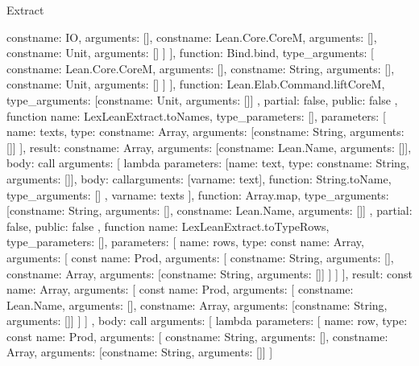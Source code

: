 \begin{lexlean}{Extract}
\begin{toolingmodule}
{{{{{{                    const{name: IO, arguments: []},
                    const{name: Lean.Core.CoreM, arguments: []},
                    const{name: Unit, arguments: []}
                  ]
                }
              }
            ],
            function: Bind.bind,
            type_arguments: [
              const{name: Lean.Core.CoreM, arguments: []},
              const{name: String, arguments: []},
              const{name: Unit, arguments: []}
            ]
          }
        ],
        function: Lean.Elab.Command.liftCoreM,
        type_arguments: [const{name: Unit, arguments: []}]
      },
      partial: false,
      public: false
    },
    function{
      name: LexLeanExtract.toNames,
      type_parameters: [],
      parameters: [
        {name: texts, type: const{name: Array, arguments: [const{name: String, arguments: []}]}}
      ],
      result: const{name: Array, arguments: [const{name: Lean.Name, arguments: []}]},
      body: call{
        arguments: [
          lambda{
            parameters: [{name: text, type: const{name: String, arguments: []}}],
            body: call{arguments: [var{name: text}], function: String.toName, type_arguments: []}
          },
          var{name: texts}
        ],
        function: Array.map,
        type_arguments: [const{name: String, arguments: []}, const{name: Lean.Name, arguments: []}]
      },
      partial: false,
      public: false
    },
    function{
      name: LexLeanExtract.toTypeRows,
      type_parameters: [],
      parameters: [
        {
          name: rows,
          type: const{
            name: Array,
            arguments: [
              const{
                name: Prod,
                arguments: [
                  const{name: String, arguments: []},
                  const{name: Array, arguments: [const{name: String, arguments: []}]}
                ]
              }
            ]
          }
        }
      ],
      result: const{
        name: Array,
        arguments: [
          const{
            name: Prod,
            arguments: [
              const{name: Lean.Name, arguments: []},
              const{name: Array, arguments: [const{name: String, arguments: []}]}
            ]
          }
        ]
      },
      body: call{
        arguments: [
          lambda{
            parameters: [
              {
                name: row,
                type: const{
                  name: Prod,
                  arguments: [
                    const{name: String, arguments: []},
                    const{name: Array, arguments: [const{name: String, arguments: []}]}
                  ]
}}}}}}
\end{toolingmodule}
\end{lexlean}
